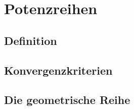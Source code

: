 %
%
%
\section{Potenzreihen
\label{buch:potenzen:section:potenzreihen}}

\subsection{Definition
\label{buch:potenzen:potenzreihen:section:definition}}

\subsection{Konvergenzkriterien
\label{buch:potenzen:potenzreihen:section:konvergenzkriterien}}

\subsection{Die geometrische Reihe
\label{buch:potenzen:potenzreihen:section:geometrische}}
